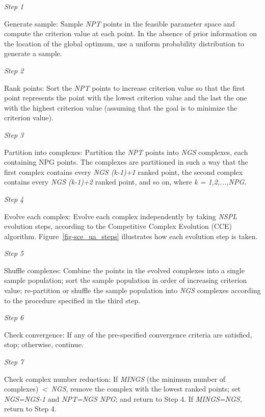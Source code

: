 \documentclass[
  letterpaper,
  DIV=11,
  numbers=noendperiod]{scrreprt}
\begin{document}
\emph{Step 1}

Generate sample: Sample \emph{NPT} points in the feasible parameter
space and compute the criterion value at each point. In the absence of
prior information on the location of the global optimum, use a uniform
probability distribution to generate a sample.

\emph{Step 2}

Rank points: Sort the \emph{NPT} points to increase criterion value so
that the first point represents the point with the lowest criterion
value and the last the one with the highest criterion value (assuming
that the goal is to minimize the criterion value).

\emph{Step 3}

Partition into complexes: Partition the \emph{NPT} points into
\emph{NGS} complexes, each containing NPG points. The complexes are
partitioned in such a way that the first complex contains every
\emph{NGS \cdot (k-1)+1} ranked point, the second complex contains every
\emph{NGS \cdot (k-1)+2} ranked point, and so on, where \emph{k =
1,2,...,NPG}.

\emph{Step 4}

Evolve each complex: Evolve each complex independently by taking
\emph{NSPL} evolution steps, according to the Competitive Complex
Evolution (CCE) algorithm. Figure~\ref{fig-sce_ua_steps} illustrates how
each evolution step is taken.

\emph{Step 5}

Shuffle complexes: Combine the points in the evolved complexes into a
single sample population; sort the sample population in order of
increasing criterion value; re-partition or shuffle the sample
population into \emph{NGS} complexes according to the procedure
specified in the third step.

\emph{Step 6}

Check convergence: If any of the pre-specified convergence criteria are
satisfied, stop; otherwise, continue.

\emph{Step 7}

Check complex number reduction: If \emph{MINGS} (the minimum number of
complexes)~\emph{\textless~NGS}, remove the complex with the lowest
ranked points; set \emph{NGS=NGS-1} and \emph{NPT=NGS \cdot NPG}; and
return to Step 4. If \emph{MINGS=NGS}, return to Step 4.
\end{document}
